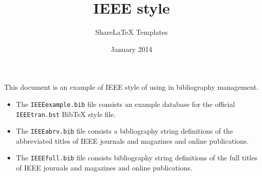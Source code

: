 \documentclass{article}
\title{IEEE \BibTeX{} style}
\author{ShareLaTeX Templates}
\date{January 2014}
\begin{document}
\maketitle

This document is an example of IEEE style of \BibTeX{} using in bibliography management. 
\begin{itemize}
\item The \texttt{IEEEexample.bib} file consists an example \BibTeX{} database for the official \texttt{IEEEtran.bst} BibTeX style file.
\item The \texttt{IEEEabrv.bib} file consists a \BibTeX{} bibliography string definitions of the abbreviated titles of IEEE journals and magazines and online publications.
\item The \texttt{IEEEfull.bib} file consists \BibTeX{} bibliography string definitions of the full titles of IEEE journals and magazines and online publications.
\end{itemize}

\nocite{*}


\end{document}

